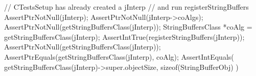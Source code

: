 
\startCTest
  // CTestsSetup has already created a jInterp
  // and run registerStringBuffers
  AssertPtrNotNull(jInterp);
  AssertPtrNotNull(jInterp->coAlgs);
  AssertPtrNotNull(getStringBuffersClass(jInterp));
  StringBuffersClass *coAlg =
    getStringBuffersClass(jInterp);
  AssertIntTrue(registerStringBuffers(jInterp));
  AssertPtrNotNull(getStringBuffersClass(jInterp));
  AssertPtrEquals(getStringBuffersClass(jInterp), coAlg);
  AssertIntEquals(
    getStringBuffersClass(jInterp)->super.objectSize,
    sizeof(StringBufferObj)
  )
\stopCTest
\stopTestCase
\stopTestSuite
